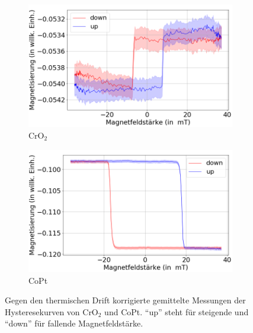 \begin{figure}[H]
    \centering
    \begin{subfigure}{0.495\textwidth}
        \centering
        \includegraphics[width=1.1\textwidth]{plots/swp_avg_magn_man_cro}
    \caption{CrO$_2$}
    \end{subfigure}
    \begin{subfigure}{0.495\textwidth}
        \centering
        \includegraphics[width=1.1\textwidth]{plots/swp_avg_magn_man_copt}
        \caption{CoPt}
    \end{subfigure}
    \caption{Gegen den thermischen Drift korrigierte gemittelte Messungen der Hysteresekurven von CrO$_2$ und CoPt. \enquote{up} steht für steigende und \enquote{down} für fallende Magnetfeldstärke.}
    \label{fig_moke_averages}
\end{figure}
